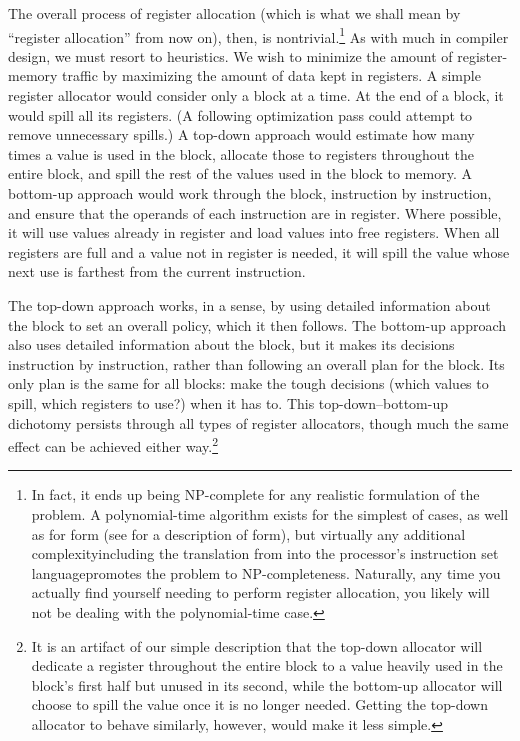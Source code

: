 The overall process of register allocation (which is what we shall mean by ``register allocation'' from now on), then, is nontrivial.\footnote{In fact, it ends up being NP-complete for any realistic formulation of the problem. A polynomial-time algorithm exists for the simplest of cases, as well as for \SSA form (see  for a description of \SSA form), but virtually any additional complexity\empause including the translation from \SSA into the processor's instruction set language\empause promotes the problem to NP-completeness. Naturally, any time you actually find yourself needing to perform register allocation, you likely will not be dealing with the polynomial-time case.} As with much in compiler design, we must resort to heuristics. We wish to minimize the amount of register-memory traffic by maximizing the amount of data kept in registers. A simple register allocator would consider only a block at a time. At the end of a block, it would spill all its registers. (A following optimization pass could attempt to remove unnecessary spills.) A top-down approach would estimate how many times a value is used in the block, allocate those to registers throughout the entire block, and spill the rest of the values used in the block to memory. A bottom-up approach would work through the block, instruction by instruction, and ensure that the operands of each instruction are in register. Where possible, it will use values already in register and load values into free registers. When all registers are full and a value not in register is needed, it will spill the value whose next use is farthest from the current instruction.

The top-down approach works, in a sense, by using detailed information about the block to set an overall policy, which it then follows. The bottom-up approach also uses detailed information about the block, but it makes its decisions instruction by instruction, rather than following an overall plan for the block. Its only plan is the same for all blocks: make the tough decisions (which values to spill, which registers to use?) when it has to. This top-down--bottom-up dichotomy persists through all types of register allocators, though much the same effect can be achieved either way.\footnote{It is an artifact of our simple description that the top-down allocator will dedicate a register throughout the entire block to a value heavily used in the block's first half but unused in its second, while the bottom-up allocator will choose to spill the value once it is no longer needed. Getting the top-down allocator to behave similarly, however, would make it less simple.}

